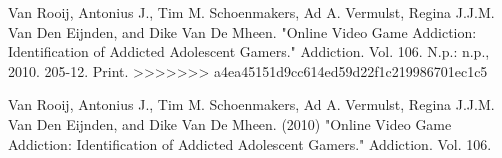 \documentclass[a4paper,man,natbib]{apa6}
\begin{document}
Van Rooij, Antonius J., Tim M. Schoenmakers, Ad A. Vermulst, Regina J.J.M. Van Den Eijnden, and Dike Van De Mheen. "Online Video Game Addiction: Identification of Addicted Adolescent Gamers." Addiction. Vol. 106. N.p.: n.p., 2010. 205-12. Print.
>>>>>>> a4ea45151d9cc614ed59d22f1c219986701ec1c5

Van Rooij, Antonius J., Tim M. Schoenmakers, Ad A. Vermulst, Regina J.J.M. Van Den Eijnden, and Dike Van De Mheen. (2010) "Online Video Game Addiction: Identification of Addicted Adolescent Gamers." Addiction. Vol. 106.
\end{document}
